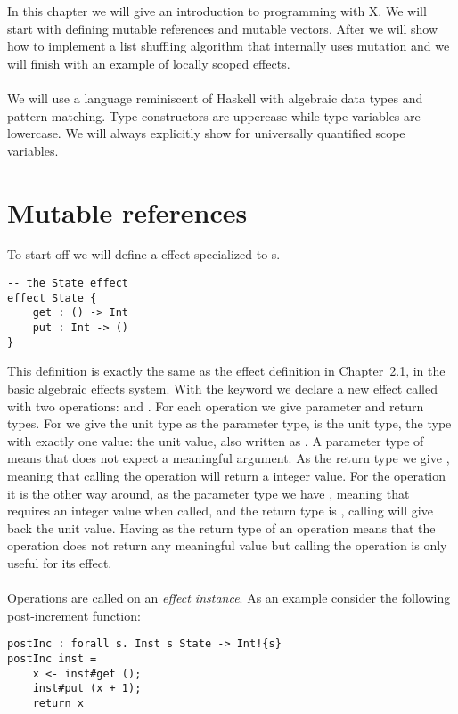 \iffalse
\fi

In this chapter we will give an introduction to programming with X. We will start with defining mutable references and mutable vectors. After we will show how to implement a list shuffling algorithm that internally uses mutation and we will finish with an example of locally scoped effects.
\\\\
We will use a language reminiscent of Haskell with algebraic data types and pattern matching.
Type constructors are uppercase while type variables are lowercase.
We will always explicitly show  for universally quantified scope variables.

\section{Mutable references}
To start off we will define a  effect specialized to s.
\begin{verbatim}
-- the State effect
effect State {
	get : () -> Int
	put : Int -> ()
}
\end{verbatim}

This definition is exactly the same as the  effect definition in Chapter~2.1, in the basic algebraic effects system.
With the  keyword we declare a new effect called  with two operations:  and .
For each operation we give parameter and return types. For  we give the unit type \ident{()} as the parameter type, \ident{()} is the unit type, the type with exactly one value: the unit value, also written as \ident{()}. A parameter type of \ident{()} means that  does not expect a meaningful argument. As the return type we give , meaning that calling the  operation will return a integer value. For the  operation it is the other way around, as the parameter type we have , meaning that  requires an integer value when called, and the return type is \ident{()}, calling  will give back the unit value. Having \ident{()} as the return type of an operation means that the operation does not return any meaningful value but calling the operation is only useful for its effect.
\\\\
Operations are called on an \emph{effect instance}.
As an example consider the following post-increment function:
\begin{verbatim}
postInc : forall s. Inst s State -> Int!{s}
postInc inst =
	x <- inst#get ();
	inst#put (x + 1);
	return x
\end{verbatim}

